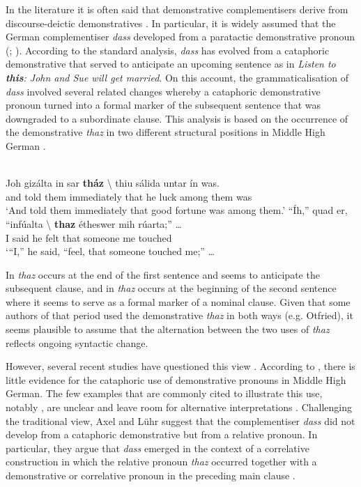 \documentclass[output=paper,colorlinks,citecolor=brown]{langscibook}
\begin{document}
In the literature it is often said that demonstrative complementisers derive from discourse-deictic demonstratives \citep[287]{HarrisCampbell1995}. In particular, it is widely assumed that the German complementiser \textit{dass} developed from a paratactic demonstrative pronoun (\citealt[30]{Behaghel1928}; \citealt[26]{Ebert1978}). According to the standard analysis, \textit{dass} has evolved from a cataphoric demonstrative that served to anticipate an upcoming sentence as in \textit{Listen to \textbf{this}: John and Sue will get married}. On this account, the grammaticalisation of \textit{dass} involved several related changes whereby a cataphoric demonstrative pronoun turned into a formal marker of the subsequent sentence that was downgraded to a subordinate clause. This analysis is based on the occurrence of the demonstrative \textit{thaz} in two different structural positions in Middle High German .

\ea\label{ex:diessel:22}
\\
\ea\label{ex:diessel:22a}
\gll   Joh   gizálta  in  sar  \textbf{tház} {\textbackslash}   thiu   sálida  untar  ín  was.\\
       and   told  them  immediately  that  {} he   luck  among  them  was\\
\glt   ‘And told them immediately that good fortune was among them.’
\ex\label{ex:diessel:22b}
\gll   “Íh,”  quad  er,   “infúalta {\textbackslash}  \textbf{thaz}  étheswer    mih   rúarta;” …\\
       {\db}I  said  he   {\db}felt {}   that  someone  me  touched\\
\glt   ‘“I,” he said, “feel, that someone touched me;” …
\z
\z

In  \textit{thaz} occurs at the end of the first sentence and seems to anticipate the subsequent clause, and in  \textit{thaz} occurs at the beginning of the second sentence where it seems to serve as a formal marker of a nominal clause. Given that some authors of that period used the demonstrative \textit{thaz} in both ways (e.g. Otfried), it seems plausible to assume that the alternation between the two uses of \textit{thaz} reflects ongoing syntactic change.

However, several recent studies have questioned this view \citep{Lühr2008,Axel2009,SchmidtkeBode2014}. According to \citet{Axel2009}, there is little evidence for the cataphoric use of demonstrative pronouns in Middle High German. The few examples that are commonly cited to illustrate this use, notably , are unclear and leave room for alternative interpretations \citep[25]{Axel2009}. Challenging the traditional view, Axel and Lühr suggest that the complementiser \textit{dass} did not develop from a cataphoric demonstrative but from a relative pronoun. In particular, they argue that \textit{dass} emerged in the context of a correlative construction in which the relative pronoun \textit{thaz} occurred together with a demonstrative or correlative pronoun in the preceding main clause .
\end{document}
